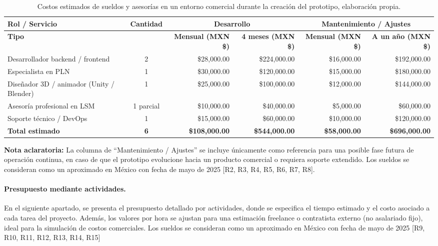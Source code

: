 \begin{table}[H]
	\centering
	\renewcommand{\arraystretch}{1.6}
	\setlength{\tabcolsep}{10pt}
	\Huge
	\begin{adjustbox}{max width=\textwidth}
		\begin{tabular}{|p{5.8cm}|c|r|r|r|r|}
			\hline
			\textbf{Rol / Servicio} & \textbf{Cantidad} & \multicolumn{2}{c|}{\textbf{Desarrollo}} & \multicolumn{2}{c|}{\textbf{Mantenimiento / Ajustes}} \\ \hline
			\textbf{Tipo} & & \textbf{Mensual (MXN \$)} & \textbf{4 meses (MXN \$)} & \textbf{Mensual (MXN \$)} & \textbf{A un año (MXN \$)} \\ \hline
			Desarrollador backend / frontend & 2 & \$28,000.00 & \$224,000.00 & \$16,000.00 & \$192,000.00 \\ \hline
			Especialista en PLN & 1 & \$30,000.00 & \$120,000.00 & \$15,000.00 & \$180,000.00 \\ \hline
			Diseñador 3D / animador (Unity / Blender) & 1 & \$25,000.00 & \$100,000.00 & \$12,000.00 & \$144,000.00 \\ \hline
			Asesoría profesional en LSM & 1 parcial & \$10,000.00 & \$40,000.00 & \$5,000.00 & \$60,000.00 \\ \hline
			Soporte técnico / DevOps & 1 & \$15,000.00 & \$60,000.00 & \$10,000.00 & \$120,000.00 \\ \hline
			\textbf{Total estimado} & \textbf{6} & \textbf{\$108,000.00} & \textbf{\$544,000.00} & \textbf{\$58,000.00} & \textbf{\$696,000.00} \\ \hline
		\end{tabular}
	\end{adjustbox}
	\caption[Costos estimados de sueldos y asesorías en un entorno comercial durante la creación del prototipo]{Costos estimados de sueldos y asesorías en un entorno comercial durante la creación del prototipo, elaboración propia.}	
	\label{tab:sueldos_comercial}
\end{table}



\noindent \textbf{Nota aclaratoria:}  
La columna de “Mantenimiento / Ajustes” se incluye únicamente como referencia para una posible fase futura de operación continua, en caso de que el prototipo evolucione hacia un producto comercial o requiera soporte extendido. Los sueldos se consideran como un aproximado en México con fecha de mayo de 2025 [R2, R3, R4, R5, R6, R7, R8].  


\paragraph{\textbf{Presupuesto mediante actividades.}} 
En el siguiente apartado, se presenta el presupuesto detallado por actividades, donde se especifica el tiempo estimado y el costo asociado a cada tarea del proyecto. Además, los valores por hora se ajustan para una estimación freelance o contratista externo (no asalariado fijo), ideal para la simulación de costos comerciales.  Los sueldos se consideran como un aproximado en México con fecha de mayo de 2025 [R9, R10, R11, R12, R13, R14, R15]

